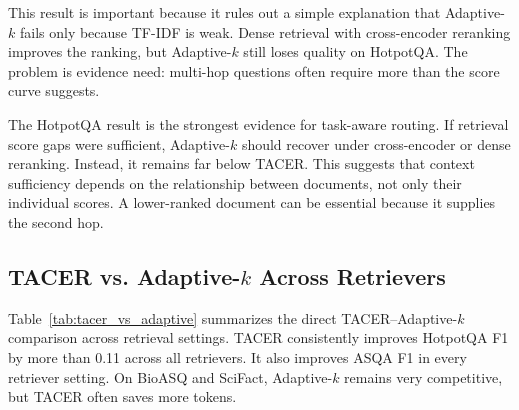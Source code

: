 \documentclass[11pt]{article}
\begin{document}
\begin{table}[t]
\centering
\small
\caption{HotpotQA under stronger retrievers.}
\label{tab:hotpot_retrievers}
\end{table}

This result is important because it rules out a simple explanation that Adaptive-$k$ fails only because TF-IDF is weak. Dense retrieval with cross-encoder reranking improves the ranking, but Adaptive-$k$ still loses quality on HotpotQA. The problem is evidence need: multi-hop questions often require more than the score curve suggests.

The HotpotQA result is the strongest evidence for task-aware routing. If retrieval score gaps were sufficient, Adaptive-$k$ should recover under cross-encoder or dense reranking. Instead, it remains far below TACER. This suggests that context sufficiency depends on the relationship between documents, not only their individual scores. A lower-ranked document can be essential because it supplies the second hop.

\subsection{TACER vs. Adaptive-$k$ Across Retrievers}

Table~\ref{tab:tacer_vs_adaptive} summarizes the direct TACER--Adaptive-$k$ comparison across retrieval settings. TACER consistently improves HotpotQA F1 by more than 0.11 across all retrievers. It also improves ASQA F1 in every retriever setting. On BioASQ and SciFact, Adaptive-$k$ remains very competitive, but TACER often saves more tokens.
\end{document}

